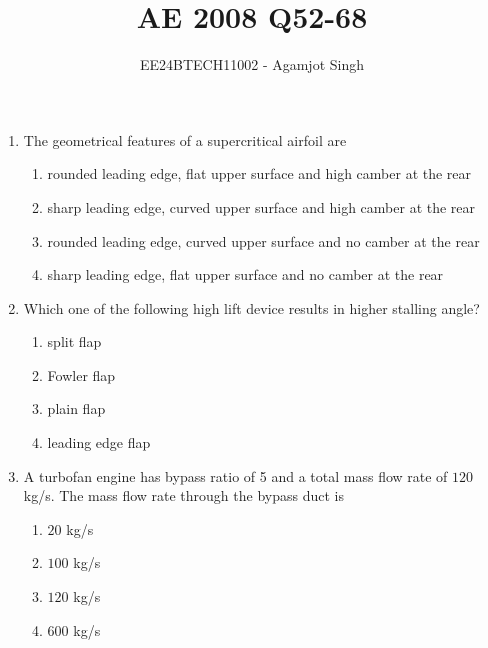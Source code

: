 \documentclass[journal,onecolumn]{IEEEtran}
\theoremstyle{remark}
\begin{document}

\vspace{3cm}

\title{AE 2008 Q52-68}
\author{EE24BTECH11002 - Agamjot Singh}
\maketitle

\renewcommand{\thefigure}{\theenumi}
\renewcommand{\thetable}{\theenumi}

\begin{enumerate}
    \item The geometrical features of a supercritical airfoil are
	\hfill{}

	\begin{enumerate}
		\item rounded leading edge, flat upper surface and high camber at the rear
		\item sharp leading edge, curved upper surface and high camber at the rear
		\item rounded leading edge, curved upper surface and no camber at the rear
		\item sharp leading edge, flat upper surface and no camber at the rear
	\end{enumerate}

    \item Which one of the following high lift device results in higher stalling angle?
	\hfill{}

	\begin{enumerate}
		\item split flap
		\item Fowler flap
		\item plain flap
		\item leading edge flap
	\end{enumerate}

    \item A turbofan engine has bypass ratio of 5 and a total mass flow rate of $120$ kg/s. The mass flow rate through the bypass duct is
	\hfill{}

	\begin{enumerate}
		\item $20$ kg/s
		\item $100$ kg/s
		\item $120$ kg/s
		\item $600$ kg/s
	\end{enumerate}



\end{enumerate}
\end{document}
